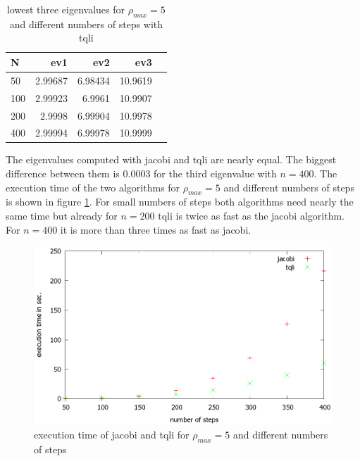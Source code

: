 \documentclass[11pt,a4wide]{article}
\begin{document}
\begin{table}%
\centering
\caption{lowest three eigenvalues for $\rho_{max}=5$ and different numbers of steps with tqli}
\begin{tabular}{lrrrr}\hline
N & ev1 & ev2 & ev3\\\hline
50 & 2.99687	& 6.98434	& 10.9619\\ 
100	& 2.99923	& 6.9961	& 10.9907\\ 
200	& 2.9998	& 6.99904	& 10.9978\\ 
400	& 2.99994	& 6.99978	& 10.9999\\\hline 
\end{tabular}
\label{tab:rho_max=5 dif. n tqli}
\end{table}      
The eigenvalues computed with jacobi and tqli are nearly equal. The biggest difference between them is $0.0003$ for the third eigenvalue with $n=400$. The execution time of the two algorithms for $\rho_{max}=5$ and different numbers of steps is shown in figure \ref{fig:execution time}. For small numbers of steps both algorithms need nearly the same time but already for $n=200$ tqli is twice as fast as the jacobi algorithm. For $n=400$ it is more than three times as fast as jacobi. 
\begin{figure}[T]%
\centering
\includegraphics[scale=0.45]{execution_time.eps}%
\caption{execution time of jacobi and tqli for $\rho_{max}=5$ and different numbers of steps}%
\label{fig:execution time}%
\end{figure}
\end{document}
